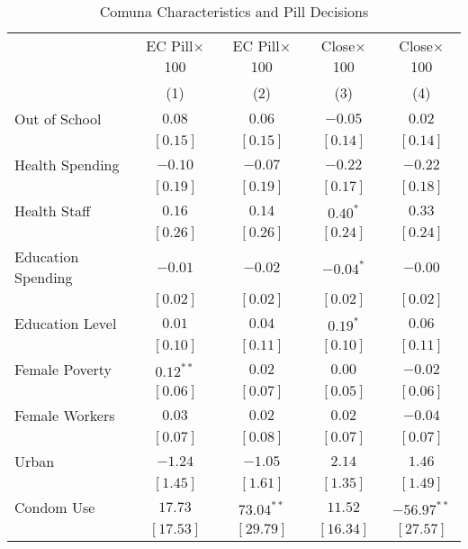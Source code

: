 
\begin{table}
\caption{Comuna Characteristics and Pill Decisions}
\begin{center}
\begin{tabular}{l c c c c }
\toprule
 & EC Pill$\times$100 & EC Pill$\times$100 & Close$\times$100 & Close$\times$100 \\
&(1)&(2)&(3)&(4) \\ \midrule
Out of School       & $0.08$       & $0.06$       & $-0.05$     & $0.02$        \\
                    & $[0.15]$     & $[0.15]$     & $[0.14]$    & $[0.14]$      \\
Health Spending     & $-0.10$      & $-0.07$      & $-0.22$     & $-0.22$       \\
                    & $[0.19]$     & $[0.19]$     & $[0.17]$    & $[0.18]$      \\
Health Staff        & $0.16$       & $0.14$       & $0.40^{*}$  & $0.33$        \\
                    & $[0.26]$     & $[0.26]$     & $[0.24]$    & $[0.24]$      \\
Education Spending  & $-0.01$      & $-0.02$      & $-0.04^{*}$ & $-0.00$       \\
                    & $[0.02]$     & $[0.02]$     & $[0.02]$    & $[0.02]$      \\
Education Level     & $0.01$       & $0.04$       & $0.19^{*}$  & $0.06$        \\
                    & $[0.10]$     & $[0.11]$     & $[0.10]$    & $[0.11]$      \\
Female Poverty      & $0.12^{**}$  & $0.02$       & $0.00$      & $-0.02$       \\
                    & $[0.06]$     & $[0.07]$     & $[0.05]$    & $[0.06]$      \\
Female Workers      & $0.03$       & $0.02$       & $0.02$      & $-0.04$       \\
                    & $[0.07]$     & $[0.08]$     & $[0.07]$    & $[0.07]$      \\
Urban               & $-1.24$      & $-1.05$      & $2.14$      & $1.46$        \\
                    & $[1.45]$     & $[1.61]$     & $[1.35]$    & $[1.49]$      \\
Condom Use          & $17.73$      & $73.04^{**}$ & $11.52$     & $-56.97^{**}$ \\
                    & $[17.53]$    & $[29.79]$    & $[16.34]$   & $[27.57]$     \\

\end{tabular}
\end{center}
\end{table}
